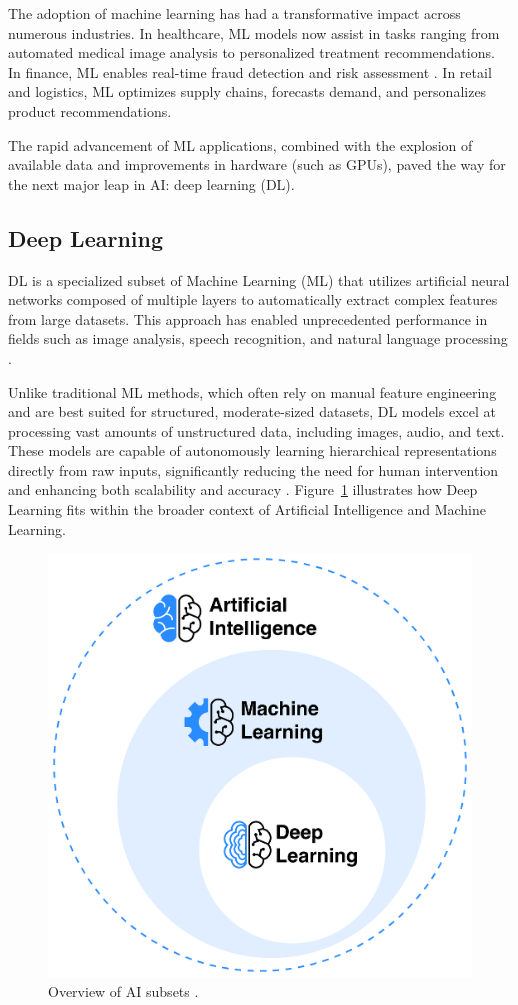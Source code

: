 \documentclass[a4paper,10pt]{book}
\begin{document}
The adoption of machine learning has had a transformative impact across numerous industries. In healthcare, ML models now assist in tasks ranging from automated medical image analysis to personalized treatment recommendations. In finance, ML enables real-time fraud detection and risk assessment \cite{malik_credit_2024}. In retail and logistics, ML optimizes supply chains, forecasts demand, and personalizes product recommendations.

The rapid advancement of ML applications, combined with the explosion of available data and improvements in hardware (such as GPUs), paved the way for the next major leap in AI: deep learning (DL).


\subsection{Deep Learning}

DL is a specialized subset of Machine Learning (ML) that utilizes artificial neural networks composed of multiple layers to automatically extract complex features from large datasets. This approach has enabled unprecedented performance in fields such as image analysis, speech recognition, and natural language processing \cite{holdsworthWhatDeepLearning2024}.

Unlike traditional ML methods, which often rely on manual feature engineering and are best suited for structured, moderate-sized datasets, DL models excel at processing vast amounts of unstructured data, including images, audio, and text. These models are capable of autonomously learning hierarchical representations directly from raw inputs, significantly reducing the need for human intervention and enhancing both scalability and accuracy \cite{holdsworthWhatDeepLearning2024}. Figure~\ref{fig:ai_overview} illustrates how Deep Learning fits within the broader context of Artificial Intelligence and Machine Learning.

\begin{figure}[h!]
    \centering
    \includegraphics[width=0.5\linewidth]{reports//assets/ai.png}
    \caption[AI overview]{Overview of AI subsets \cite{nasaWhatArtificialIntelligence}.}
    \label{fig:ai_overview}
\end{figure}
\end{document}
